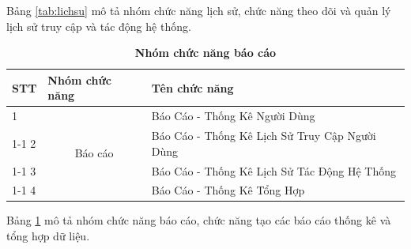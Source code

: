 \documentclass{article} %
\begin{document}
Bảng \ref{tab:lichsu} mô tả nhóm chức năng lịch sử, chức năng theo dõi và quản lý lịch sử truy cập và tác động hệ thống.

\begin{table}[H]
    \centering   
    \caption[Nhóm chức năng báo cáo]{\bfseries\fontsize{12pt}{0pt}\selectfont Nhóm chức năng báo cáo}
    \begin{tabular}{|l|c|l|}
    \hline
    \textbf{STT} & \multicolumn{1}{l|}{\textbf{Nhóm chức năng}} & \textbf{Tên chức năng}                         \\ \hline
    1            & \multirow{4}{*}{Báo cáo}                     & Báo Cáo - Thống Kê Người Dùng                  \\ \cline{1-1} \cline{3-3} 
    2            &                                              & Báo Cáo - Thống Kê Lịch Sử Truy Cập Người Dùng \\ \cline{1-1} \cline{3-3} 
    3            &                                              & Báo Cáo - Thống Kê Lịch Sử Tác Động Hệ Thống   \\ \cline{1-1} \cline{3-3} 
    4            &                                              & Báo Cáo - Thống Kê Tổng Hợp                    \\ \hline
    \end{tabular}
    \label{tab:baocao}
\end{table}

Bảng \ref{tab:baocao} mô tả nhóm chức năng báo cáo, chức năng tạo các báo cáo thống kê và tổng hợp dữ liệu.
\end{document}
